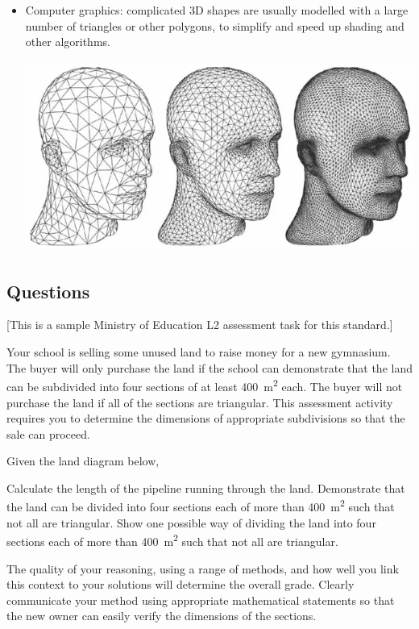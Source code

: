 \begin{center}
\begin{tcolorbox}[width=0.8\textwidth,colback={white},title={\textbf{What's it good for?}},colbacktitle=MidnightBlue,coltitle=white]
\begin{itemize}
\begin{center}
      \end{center}
    \item Computer graphics: complicated 3D shapes are usually modelled with a large number of triangles or other polygons, to simplify and
          speed up shading and other algorithms.
      \begin{center}
        \includegraphics[height=0.4\textwidth]{modelling}
      \end{center}
  \end{itemize}
\end{tcolorbox}
\end{center}

\clearpage
\subsection*{Questions}
[This is a sample Ministry of Education L2 assessment task for this standard.]

Your school is selling some unused land to raise money for a new gymnasium. The buyer will only purchase the land if the school can demonstrate that
the land can be subdivided into four sections of at least \SI{400}{\metre\squared} each. The buyer will not purchase the land if all of the sections
are triangular. This assessment activity requires you to determine the dimensions of appropriate subdivisions so that the sale can proceed.

Given the land diagram below,
\begin{questions}
  \question Calculate the length of the pipeline running through the land.
  \question Demonstrate that the land can be divided into four sections each of more than \SI{400}{\metre\squared} such that not all are triangular.
  \question Show one possible way of dividing the land into four sections each of more than \SI{400}{\metre\squared} such that not all are triangular.
\end{questions}

The quality of your reasoning, using a range of methods, and how well you link this context to your solutions will determine the overall grade.
Clearly communicate your method using appropriate mathematical statements so that the new owner can easily verify the dimensions of the sections.

